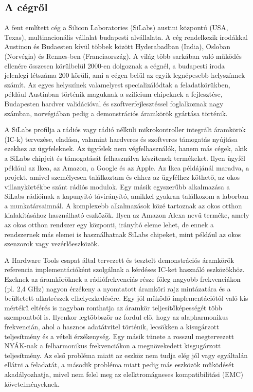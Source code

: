 \documentclass[a4paper,12pt,titlepage]{article}
\begin{document}
    \subsection{A cégről}
        A fent említett cég a Silicon Laboratories (SiLabs) austini központú (USA, Texas), multinacionális vállalat budapesti alvállalata. A cég rendelkezik irodákkal Austinon és Budaesten kívül többek között Hyderabadban (India), Osloban (Norvégia) és Rennes-ben (Franciaország). A világ több sarkában való működés ellenére összesen körülbelül 2000-en dolgoznak a cégnél, a budapesti iroda jelenlegi létszáma 200 körüli, ami a cégen belül az egyik legnépesebb helyszínnek számít. Az egyes helyszínek valamelyest specializálódtak a feladatkörükben, például Austinban történik maguknak a szilícium chipeknek a fejlesztése, Budapesten hardver validációval és szoftverfejlesztéssel foglalkoznak nagy számban, norvégiában pedig a demonstrációs áramkörök gyártása történik.
        \par
        A SiLabs profilja a rádiós vagy rádió nélküli mikrokontroller integrált áramkörök (IC-k) tervezése, eladása, valamint hardveres és szoftveres támogatás nyújtása ezekhez az ügyfeleknek. Az ügyfelek nem végfelhasználók, hanem más cégek, akik a SiLabs chipjeit és támogatását felhasználva készítenek termékeket. Ilyen ügyfél például az Ikea, az Amazon, a Google és az Apple. Az Ikea példájánál maradva, a projekt, amivel személyesen találkoztam és ehhez az ügyfélhez köthető, az okos villanykörtékbe szánt rádiós modulok. Egy másik egyszerűbb alkalmazása a SiLabs rádióinak a kapunyitó távirányító, amikkel gyakran találkozom a laborban a munkatársaimnál. A komplexebb alkalmazások közé tartoznak az okos otthon kialakításához használható eszközök. Ilyen az Amazon Alexa nevű terméke, amely az okos otthon rendszer egy központi, irányító eleme lehet, de ennek a rendszernek más elemei is használhatnak SiLabs chipeket, mint például az okos szenzorok vagy vezérlőeszközök.
        \par
        A Hardware Tools csapat által tervezett és tesztelt demonstrációs áramkörök referencia implementációként szolgálnak a kérdéses IC-ket használó eszközökhöz. Ezeknek az áramköröknek a rádiófrekvenciás része főleg nagyobb frekvenciákon (pl. 2,4 GHz) nagyon érzékeny a nyomtatott áramköri rajz mintázatára és a beültetett alkatrészek elhelyezkedésére. Egy jól működő implementációtól való kis mértékű eltérés is nagyban ronthatja az áramkör teljesítőképességét több szempontból is. Ilyenkor legtöbbször az fordul elő, hogy az alapharmonikus frekvencián, ahol a hasznos adatátvitel történik, lecsökken a kisugárzott teljesítmény és a vételi érzékenység. Egy másik tünete a rosszul megtervezett NYÁK-nak a felharmonikus frekvenciákon a megnövekedett kisgugárzott teljesítmény. Az első probléma miatt az eszköz nem tudja elég jól vagy egyáltalán ellátni a feladatát, a második probléma miatt pedig más eszközök működését akadályozhatja, mivel nem felel meg az elelktromágneses kompatibilitási (EMC) követelményeknek.
\end{document}
